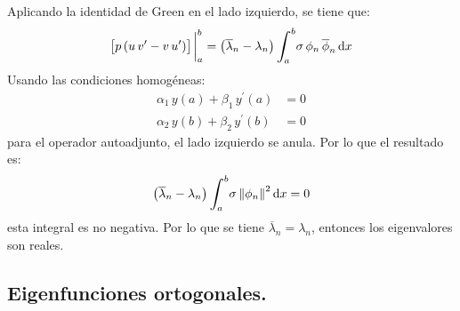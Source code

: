 \documentclass[12pt]{article}
\newcommand{\ptilde}[1]{\ensuremath{{#1}^{\prime}}}
\newcommand{\pderivada}[1]{\ensuremath{{#1}^{\prime}}}
\def\scaleint#1{\vcenter{\hbox{\scaleto[3ex]{\displaystyle\int}{#1}}}}
\def\bs{\mkern-12mu}
\numberwithin{equation}{section}
\begin{document}
Aplicando la identidad de Green en el lado izquierdo, se tiene que:
\begin{align*}
\big[ p \, (u \, \pderivada{v} - v \, \pderivada{u}) \big]\eval_{a}^{b} = \big( \overline{\lambda}_{n} - \lambda_{n} \big) \, \scaleint{6ex}_{\bs a}^{b} \sigma \, \phi_{n} \, \overline{\phi}_{n} \dd{x}
\end{align*}
Usando las condiciones homogéneas:
\begin{align*}
\alpha_{1} \, y (a) + \beta_{1} \, \ptilde{y} (a) &= 0 \\[0.5em]
\alpha_{2} \, y (b) + \beta_{2} \, \ptilde{y} (b) &= 0
\end{align*}
para el operador autoadjunto, el lado izquierdo se anula. Por lo que el resultado es:
\begin{align*}
\big( \overline{\lambda}_{n} - \lambda_{n} \big) \, \scaleint{6ex}_{\bs a}^{b} \sigma \, \norm{\phi_{n}}^{2} \dd{x} = 0
\end{align*}
esta integral es no negativa. Por lo que se tiene $\overline{\lambda}_{n} = \lambda_{n}$, entonces los eigenvalores son reales.

\subsection{Eigenfunciones ortogonales.}
\end{document}
